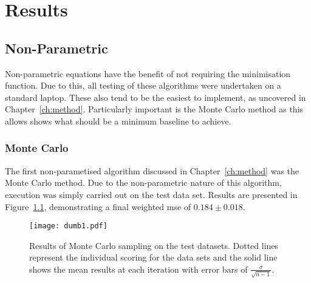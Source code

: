 \chapter{Results}


\graphicspath{{Chapter4/Figs/Vector/}{Chapter4/Figs/}}

\section{Non-Parametric}
Non-parametric equations have the benefit of not requiring the minimisation function. Due to this, all testing of these algorithms were undertaken on a standard laptop. These also tend to be the easiest to implement, as uncovered in Chapter~\ref{ch:method}. Particularly important is the Monte Carlo method as this allows shows what should be a minimum baseline to achieve.

\subsection{Monte Carlo}
The first non-parametised algorithm discussed in Chapter~\ref{ch:method} was the Monte Carlo method. Due to the non-parametric nature of this algorithm, execution was simply carried out on the test data set. Results are presented in Figure~\ref{fig:MCTestSet}, demonstrating a final weighted mse of ${0.184\pm{}0.018}$.
\begin{figure}[H]
    \begin{center}
        \texttt{[image: dumb1.pdf]}
        \caption[Monte Carlo]{Results of Monte Carlo sampling on the test datasets. Dotted lines represent the individual scoring for the data sets and the solid line shows the mean results at each iteration with error bars of $\frac{\sigma{}}{\sqrt{n-1}}$.}
        \label{fig:MCTestSet}
    \end{center}
\end{figure}

